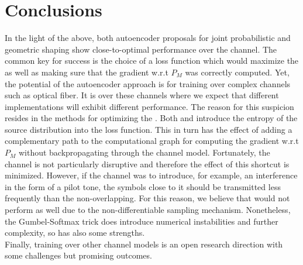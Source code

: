 \chapter{Conclusions}\label{chap:conclusions}

In the light of the above, both autoencoder proposals for joint probabilistic and geometric shaping show close-to-optimal performance over the  channel. The common key for success is the choice of a loss function which would maximize the  as well as making sure that the gradient w.r.t $P_M$ was correctly computed. Yet, the potential of the autoencoder approach is for training over complex channels such as optical fiber. It is over these channels where we expect that different implementations will exhibit different performance. The reason for this suspicion resides in the methods for optimizing the . Both \citep{Aref} and \cite{Stark} introduce the entropy of the source distribution into the loss function. This in turn has the effect of adding a complementary path to the computational graph for computing the gradient w.r.t $P_M$ without backpropagating through the channel model. Fortunately, the  channel is not particularly disruptive and therefore the effect of this shortcut is minimized. However, if the channel was to introduce, for example, an interference in the form of a pilot tone, the symbols close to it should be transmitted less frequently than the non-overlapping. For this reason, we believe that \cite{Aref} would not perform as well due to the non-differentiable sampling mechanism. Nonetheless, the Gumbel-Softmax trick does introduce numerical instabilities and further complexity, so \cite{Aref} has also some strengths.\\
Finally, training over other channel models is an open research direction with some challenges but promising outcomes.